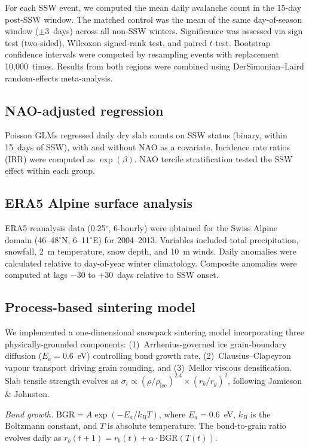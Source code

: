 \documentclass[11pt,letterpaper]{article}
\begin{document}
For each SSW event, we computed the mean daily avalanche count in the 15-day post-SSW window. The matched control was the mean of the same day-of-season window ($\pm 3$~days) across all non-SSW winters. Significance was assessed via sign test (two-sided), Wilcoxon signed-rank test, and paired $t$-test. Bootstrap confidence intervals were computed by resampling events with replacement 10,000~times. Results from both regions were combined using DerSimonian--Laird random-effects meta-analysis.

\subsection{NAO-adjusted regression}

Poisson GLMs regressed daily dry slab counts on SSW status (binary, within 15~days of SSW), with and without NAO as a covariate. Incidence rate ratios (IRR) were computed as $\exp(\beta)$. NAO tercile stratification tested the SSW effect within each group.

\subsection{ERA5 Alpine surface analysis}

ERA5 reanalysis data (0.25$^\circ$, 6-hourly) were obtained for the Swiss Alpine domain (46--48$^\circ$N, 6--11$^\circ$E) for 2004--2013. Variables included total precipitation, snowfall, 2~m temperature, snow depth, and 10~m winds. Daily anomalies were calculated relative to day-of-year winter climatology. Composite anomalies were computed at lags $-30$ to $+30$~days relative to SSW onset.

\subsection{Process-based sintering model}

We implemented a one-dimensional snowpack sintering model incorporating three physically-grounded components: (1)~Arrhenius-governed ice grain-boundary diffusion ($E_a = 0.6$~eV) controlling bond growth rate, (2)~Clausius--Clapeyron vapour transport driving grain rounding, and (3)~Mellor viscous densification. Slab tensile strength evolves as $\sigma_t \propto (\rho/\rho_{\text{ice}})^{2.4} \times (r_b/r_g)^2$, following Jamieson \& Johnston.

\textit{Bond growth.} $\mathrm{BGR} = A \exp(-E_a / k_B T)$, where $E_a = 0.6$~eV, $k_B$ is the Boltzmann constant, and $T$ is absolute temperature. The bond-to-grain ratio evolves daily as $r_b(t+1) = r_b(t) + \alpha \cdot \mathrm{BGR}(T(t))$.
\end{document}
